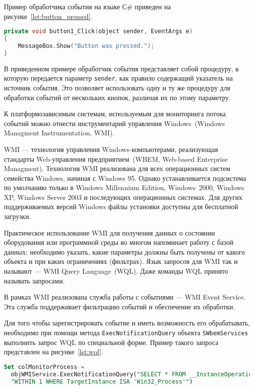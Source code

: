 Пример обработчика события на языке С\# приведен на рисунке~\ref{lst:button_pressed}.
\begin{lstlisting}[basicstyle=\scriptsize\ttfamily,
                   numberstyle=\scriptsize\ttfamily,
                   xleftmargin=7mm,
                   language=C++,caption=Пример обработчика событий на языке C\#,
                   label=lst:button_pressed]
private void button1_Click(object sender, EventArgs e)
{
    MessageBox.Show("Button was pressed.");
}
\end{lstlisting}

В приведенном примере обработчик события представляет собой процедуру, в которую
передается параметр \texttt{sender}, как правило содержащий указатель на
источник события. Это позволяет использовать одну и ту же процедуру
для обработки событий от нескольких кнопок, различая их по этому параметру.

К платформозависимым системам, используемым для мониторинга потока событий
можно отнести инструментарий управления Windows~(Windows Managment
Instrumentation, WMI).

WMI --- технология управления Windows-компьютерами, реализующая
стандарты Web-управления предприятием~(WBEM, Web-based Enterprise Managment).
Технология WMI реализована для всех операционных систем семейства Windows,
начиная с Windows 95. Однако устанавливается подсистема по умолчанию только
в Windows Millennium Edition, Windows~2000, Windows XP, Windows Server 2003 и
последующих операционных системах. Для других поддерживаемых версий Windows
файлы установки доступны для бесплатной загрузки.

Практическое использование WMI для получения данных о состоянии оборудования
или программной среды во многом напоминает работу с базой данных: необходимо
указать, какие параметры должны быть получены от какого объекта и при каких
ограничениях (фильтрах). Язык запросов для WMI так и называют --- WMI Query
Language~(WQL). Даже команды WQL принято называть запросами.


В рамках WMI реализована служба работы с событиями --- WMI Event Service. Эта
служба поддерживает фильтрацию событий и обеспечение их обработки.

Для того чтобы зарегистрировать событие и иметь возможность его обрабатывать,
необходимо при помощи метода \texttt{ExecNotificationQuery} объекта
\texttt{SWbemServices} выполнить запрос WQL по специальной форме.
Пример такого запроса представлен на рисунке~\ref{lst:wql}.
\begin{lstlisting}[basicstyle=\scriptsize\ttfamily,
                   numberstyle=\scriptsize\ttfamily,
                   xleftmargin=7mm,
                   language=sql,caption=Пример WQL запроса,
                   label=lst:wql]
Set colMonitorProcess =
  objWMIService.ExecNotificationQuery("SELECT * FROM __InstanceOperationEvent " &
  "WITHIN 1 WHERE TargetInstance ISA 'Win32_Process'")
\end{lstlisting}

